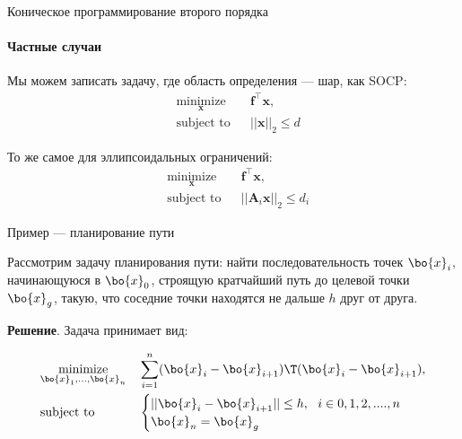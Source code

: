 \documentclass{beamer}
\begin{document}
\begin{frame}{Коническое программирование второго порядка}
	\framesubtitle{Частные случаи}
	\begin{flushleft}
		
		Мы можем записать задачу, где область определения — шар, как SOCP:
		\begin{equation}
			\begin{aligned}
				& \underset{\mathbf{x}}{\text{minimize}}
				& & \mathbf{f}^\top\mathbf{x}, \\
				& \text{subject to}
				& & ||\mathbf{x}||_2 \leq d
			\end{aligned}
		\end{equation}
		
		\bigskip
		
		То же самое для эллипсоидальных ограничений:
		\begin{equation}
			\begin{aligned}
				& \underset{\mathbf{x}}{\text{minimize}}
				& & \mathbf{f}^\top\mathbf{x}, \\
				& \text{subject to}
				& & ||\mathbf{A}_i\mathbf{x}||_2 \leq d_i
			\end{aligned}
		\end{equation}
		
	\end{flushleft}
\end{frame}




\begin{frame}{Пример — планирование пути}
	\begin{flushleft}
		
		Рассмотрим задачу планирования пути: найти последовательность точек $\bo{x}_i$, начинающуюся в $\bo{x}_0$, строящую кратчайший путь до целевой точки $\bo{x}_g$, такую, что соседние точки находятся не дальше $h$ друг от друга.
		
		\bigskip
		
		\textbf{Решение}. 
		Задача принимает вид:
		
		
		\begin{equation}
			\begin{aligned}
				& \underset{\bo{x}_1, ..., \bo{x}_n}{\text{minimize}}
				& & \sum_{i = 1}^{n} (\bo{x}_i - \bo{x}_{i+1})\T (\bo{x}_i - \bo{x}_{i+1}), \\
				& \text{subject to}
				& &
				\begin{cases}
					||\bo{x}_i - \bo{x}_{i+1} || \leq h, \ \ i \in {0, 1, 2, ...., n} \\
					\bo{x}_n = \bo{x}_g
				\end{cases}
			\end{aligned}
		\end{equation}
		
	\end{flushleft}
\end{frame}
\end{document}
